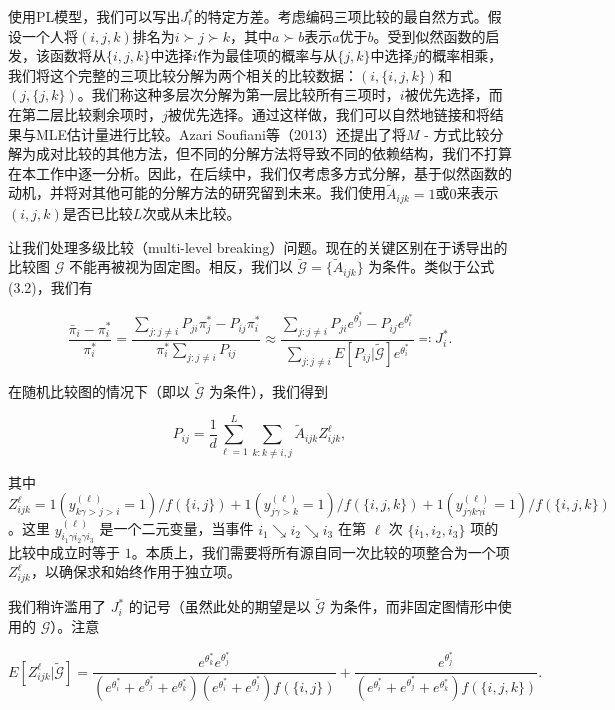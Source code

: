 使用PL模型，我们可以写出$J_{i}^{*}$的特定方差。考虑编码三项比较的最自然方式。假设一个人将$(i,j,k)$排名为$i\succ j\succ k$，其中$a\succ b$表示$a$优于$b$。受到似然函数的启发，该函数将从$\{i,j,k\}$中选择$i$作为最佳项的概率与从$\{j,k\}$中选择$j$的概率相乘，我们将这个完整的三项比较分解为两个相关的比较数据：$(i,\{i,j,k\})$和$(j,\{j,k\})$。我们称这种多层次分解为第一层比较所有三项时，$i$被优先选择，而在第二层比较剩余项时，$j$被优先选择。通过这样做，我们可以自然地链接和将结果与MLE估计量进行比较。Azari Soufiani等（2013）还提出了将$M$ - 方式比较分解为成对比较的其他方法，但不同的分解方法将导致不同的依赖结构，我们不打算在本工作中逐一分析。因此，在后续中，我们仅考虑多方式分解，基于似然函数的动机，并将对其他可能的分解方法的研究留到未来。我们使用$\widetilde{A}_{ijk} = 1$或$0$来表示$(i,j,k)$是否已比较$L$次或从未比较。

让我们处理多级比较（multi-level breaking）问题。现在的关键区别在于诱导出的比较图 $\mathcal{G}$ 不能再被视为固定图。相反，我们以 $\widetilde{\mathcal{G}} = \{\widetilde{A}_{ijk}\}$ 为条件。类似于公式 (3.2)，我们有

\[
\frac{\bar{\pi}_{i} - \pi_{i}^{*}}{\pi_{i}^{*}} = \frac{\sum_{j:j\neq i}P_{ji}\pi_{j}^{*} - P_{ij}\pi_{i}^{*}}{\pi_{i}^{*}\sum_{j:j\neq i}P_{ij}}\approx \frac{\sum_{j:j\neq i}P_{ji}e^{\theta_{j}^{*}} - P_{ij}e^{\theta_{i}^{*}}}{\sum_{j:j\neq i}E[P_{ij}|\widetilde{\mathcal{G}}]e^{\theta_{i}^{*}}} \eqqcolon J_{i}^{*}. \tag{3.6}
\]

在随机比较图的情况下（即以 $\widetilde{\mathcal{G}}$ 为条件），我们得到

\[
P_{ij} = \frac{1}{d}\sum_{\ell = 1}^{L}\sum_{k:k\neq i,j}\widetilde{A}_{ijk}Z_{ijk}^{\ell}, \tag{3.7}
\]

其中 $Z_{ijk}^{\ell} = 1(y_{k\gamma >j > i}^{(\ell)} = 1) / f(\{i,j\}) + 1(y_{j\gamma >k}^{(\ell)} = 1) / f(\{i,j,k\}) + 1(y_{j\gamma k\gamma i}^{(\ell)} = 1) / f(\{i,j,k\})$。这里 $y_{i_1\gamma i_2\gamma i_3}^{(\ell)}$ 是一个二元变量，当事件 $i_1\searrow i_2\searrow i_3$ 在第 $\ell$ 次 $\{i_1,i_2,i_3\}$ 项的比较中成立时等于 $1$。本质上，我们需要将所有源自同一次比较的项整合为一个项 $Z_{ijk}^{\ell}$，以确保求和始终作用于独立项。

我们稍许滥用了 $J_{i}^{*}$ 的记号（虽然此处的期望是以 $\widetilde{\mathcal{G}}$ 为条件，而非固定图情形中使用的 $\mathcal{G}$）。注意

$$
E[Z_{ijk}^{\ell}|\widetilde{\mathcal{G}} ] = \frac{e^{\theta_{k}^{*}}e^{\theta_{j}^{*}}}{(e^{\theta_{i}^{*}} + e^{\theta_{j}^{*}} + e^{\theta_{k}^{*}})(e^{\theta_{i}^{*}} + e^{\theta_{j}^{*}})f(\{i,j\})} +\frac{e^{\theta_{j}^{*}}}{(e^{\theta_{i}^{*}} + e^{\theta_{j}^{*}} + e^{\theta_{k}^{*}})f(\{i,j,k\})}.
$$

